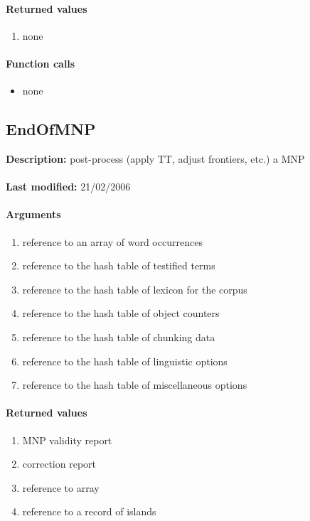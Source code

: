 \paragraph{Returned values}
\begin{enumerate}
\item none
\end{enumerate}

\paragraph{Function calls}
\begin{itemize}
\item none
\end{itemize}

\subsection{EndOfMNP}
\textbf{Description:} post-process (apply TT, adjust frontiers, etc.) a MNP\\
\\\textbf{Last modified:} 21/02/2006

\paragraph{Arguments}
\begin{enumerate}
\item reference to an array of word occurrences
\item reference to the hash table of testified terms
\item reference to the hash table of lexicon for the corpus
\item reference to the hash table of object counters
\item reference to the hash table of chunking data
\item reference to the hash table of linguistic options
\item reference to the hash table of miscellaneous options
\end{enumerate}

\paragraph{Returned values}
\begin{enumerate}
\item MNP validity report
\item correction report
\item reference to array
\item reference to a record of islands
\end{enumerate}

